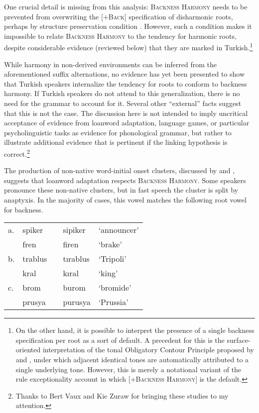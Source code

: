 One crucial detail is missing from this analysis: \textsc{Backness Harmony} needs to be prevented from overwriting the [$+$\textsc{Back}] specification of disharmonic roots, perhaps by structure preservation condition \citep{Kiparsky1985}. 
However, such a condition makes it impossible to relate \textsc{Backness Harmony} to the tendency for harmonic roots, despite considerable evidence (reviewed below) that they are marked in Turkish.\footnote{
    On the other hand, it is possible to interpret the presence of a single backness specification per root as a sort of default.
    A precedent for this is the surface-oriented interpretation of the tonal Obligatory Contour Principle proposed by \citet[134]{Goldsmith1976} and \citet{Odden1986}, under which adjacent identical tones are automatically attributed to a single underlying tone. 
    However, this is merely a notational variant of the rule exceptionality account in which [$+$\textsc{Backness Harmony}] is the default.}

While harmony in non-derived environments can be inferred from the aforementioned suffix alternations, no evidence has yet been presented to show that Turkish speakers internalize the tendency for roots to conform to backness harmony. 
    If Turkish speakers do not attend to this generalization, there is no need for the grammar to account for it. Several other ``external'' facts suggest that this is not the case. 
    The discussion here is not intended to imply uncritical acceptance of evidence from loanword adaptation, language games, or particular psycholinguistic tasks as evidence for phonological grammar, but rather to illustrate additional evidence that is pertinent if the linking hypothesis is correct.\footnote{
    Thanks to Bert Vaux and Kie Zuraw for bringing these studies to my attention.}

The production of non-native word-initial onset clusters, discussed by \citet{Clements1982} and \citet{Kaun1999}, suggests that loanword adaptation respects \textsc{Backness Harmony}. 
    Some speakers pronounce these non-native clusters, but in fast speech the cluster is split by anaptyxis. 
    In the majority of cases, this vowel matches the following root vowel for backness.

\begin{example} 
\begin{tabular}{lllll}
a. & {spiker}  & \alt{} & {sipiker}  & `announcer' \\
   & {fren}    & \alt{} & {firen}    & `brake'     \\
b. & {trablus} & \alt{} & {tırablus} & `Tripoli'   \\
   & {kral}    & \alt{} & {kıral}    & `king'      \\
c. & {brom}    & \alt{} & {burom}    & `bromide'   \\
   & {prusya}  & \alt{} & {purusya}  & `Prussia'   \\
\end{tabular}
\label{spiker}
\end{example}

